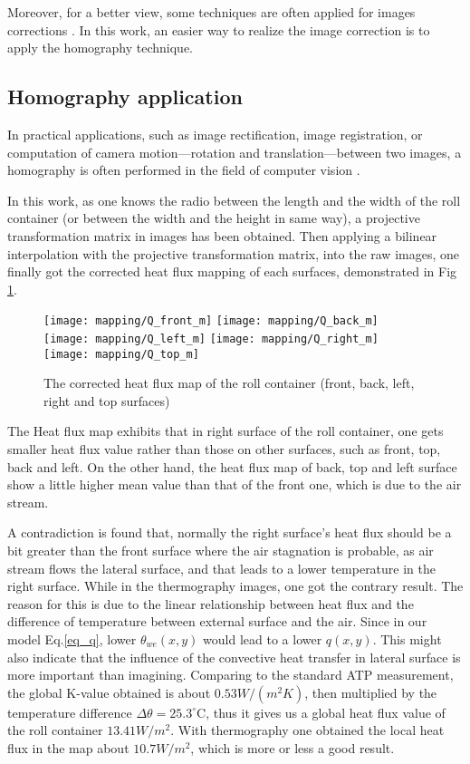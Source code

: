 Moreover, for a better view, some techniques are often applied for images corrections \citep{bison2012geometrical}. In this work, an easier way to realize the image correction is to apply the homography technique.

\subsection{Homography application}
In practical applications, such as image rectification, image registration, or computation of camera motion—rotation and translation—between two images, a homography is often performed in the field of computer vision \citep{homo_wiki}.

In this work, as one knows the radio between the length and the width of the roll container (or between the width and the height in same way), a projective transformation matrix in images has been obtained. Then applying a bilinear interpolation with the projective transformation matrix, into the raw images, one finally got the corrected heat flux mapping of each surfaces, demonstrated in Fig \ref{Q_box}.
\begin{figure}[!htbp]
	\centering
	\texttt{[image: mapping/Q\_front\_m]}
	\hspace{5pt}
	\texttt{[image: mapping/Q\_back\_m]}
	\texttt{[image: mapping/Q\_left\_m]}
	\hspace{5pt}
	\texttt{[image: mapping/Q\_right\_m]}
	\texttt{[image: mapping/Q\_top\_m]}
	\caption{The corrected heat flux map of the roll container (front,  back, left, right and top surfaces)}
	\label{Q_box}
\end{figure}

The Heat flux map exhibits that in right surface of the roll container, one gets smaller heat flux value rather than those on other surfaces, such as front, top, back and left.
On the other hand, the heat flux map of back, top and left surface show a little higher mean value than that of the front one, which is due to the air stream.

A contradiction is found that, normally the right surface's heat flux should be a bit greater than the front surface where the air stagnation is probable, as air stream flows the lateral surface, and that leads to a lower temperature in the right surface. While in the thermography images, one got the contrary result. The reason for this is due to the linear relationship between heat flux and the difference of temperature between external surface and the air. Since in our model Eq.\ref{eq_q}, lower $\theta_{we}(x,y)$ would lead to a lower $q(x,y)$. This might also indicate that the influence of the convective heat transfer in lateral surface is more important than imagining.
Comparing to the standard ATP measurement, the global K-value obtained is about $0.53 W/(m^2 K)$, then multiplied by the temperature difference $\Delta \theta =25.3^\circ$C, thus it gives us a global heat flux value of the roll container $13.41 W/m^2$. With thermography one obtained the local heat flux in the map about $10.7 W/m^2$, which is more or less a good result.

